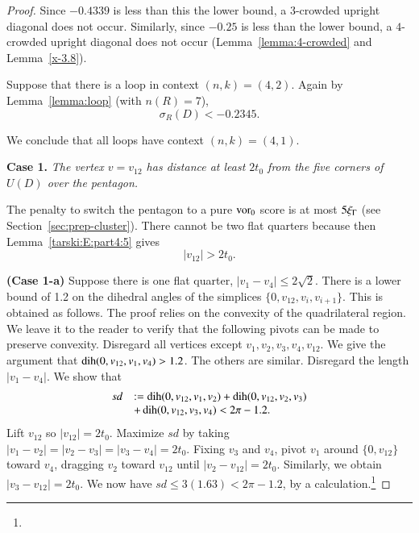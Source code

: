 \begin{proof}
Since $-0.4339$ is less than this the lower bound, a $3$-crowded
upright diagonal does not occur. Similarly, since $-0.25$ is less
than the lower bound, a $4$-crowded upright diagonal does not
occur (Lemma~\ref{lemma:4-crowded} and Lemma~\ref{x-3.8}).

Suppose that there is a loop in context $(n,k)=(4,2)$. Again by
Lemma~\ref{lemma:loop} (with $n(R)=7$),
$$\sigma_R(D)  < -0.2345.$$


We conclude that all loops have context $(n,k)=(4,1)$.


{\bf Case 1.}  {\it The vertex $v=v_{12}$ has distance at least
$2t_0$ from the five corners of $U(D)$ over the pentagon.}


The penalty to switch the pentagon to a pure $\operatorname{vor}_0$ score is at
most $5\xi_\Gamma$ (see Section~\ref{sec:prep-cluster}).  There cannot
be two flat quarters because then Lemma~\ref{tarski:E:part4:5} gives
$$|v_{12}|>2t_0.$$


{\bf (Case 1-a)} Suppose there is one flat quarter,
$|v_1-v_4|\le2\sqrt2$. There is a lower bound of 1.2 on the
dihedral angles of the simplices $\{0,v_{12},v_i,v_{i+1}\}$.  This
is obtained as follows.  The proof relies on the convexity of the
quadrilateral region.  We leave it to the reader to verify that
the following pivots can be made to preserve convexity.  Disregard
all vertices except $v_1,v_2,v_3,v_4,v_{12}$.  We give the
argument that $\operatorname{dih}(0,v_{12},v_1,v_4)>1.2$.  The others are
similar. Disregard the length $|v_1-v_4|$.  We show that
    $$
    \begin{array}{lll}
        sd &:=\operatorname{dih}(0,v_{12},v_1,v_2)+\operatorname{dih}(0,v_{12},v_2,v_3)\\
           &+\operatorname{dih}(0,v_{12},v_3,v_4) < 2\pi-1.2.
    \end{array}
    $$
Lift $v_{12}$ so $|v_{12}|=2t_0$. Maximize $sd$ by taking
$|v_1-v_2|=|v_2-v_3|=|v_3-v_4|=2t_0$.  Fixing $v_3$ and $v_4$,
pivot $v_1$ around $\{0,v_{12}\}$ toward $v_4$, dragging $v_2$
toward $v_{12}$ until $|v_2-v_{12}|=2t_0$.  Similarly, we obtain
$|v_3-v_{12}|=2t_0$. We now have $sd\le 3(1.63)< 2\pi-1.2$, by a
calculation.\footnote{}


\end{proof}
